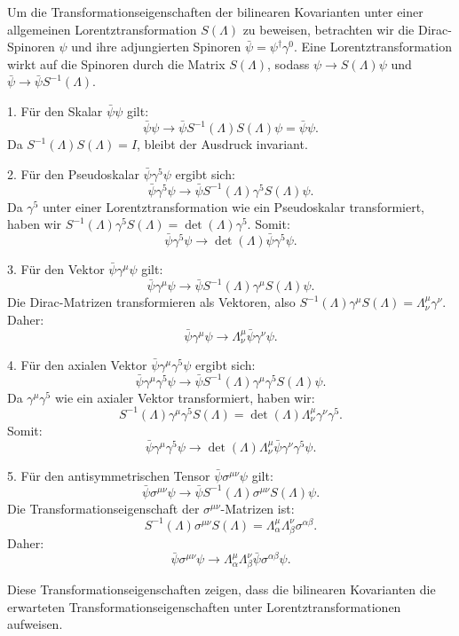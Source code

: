 Um die Transformationseigenschaften der bilinearen Kovarianten unter einer allgemeinen Lorentztransformation \( S(\Lambda) \) zu beweisen, betrachten wir die Dirac-Spinoren \(\psi\) und ihre adjungierten Spinoren \(\bar{\psi} = \psi^\dagger \gamma^0\). Eine Lorentztransformation wirkt auf die Spinoren durch die Matrix \( S(\Lambda) \), sodass \(\psi \rightarrow S(\Lambda) \psi\) und \(\bar{\psi} \rightarrow \bar{\psi} S^{-1}(\Lambda)\).

1. Für den Skalar \(\bar{\psi} \psi\) gilt:
\[
\bar{\psi} \psi \rightarrow \bar{\psi} S^{-1}(\Lambda) S(\Lambda) \psi = \bar{\psi} \psi.
\]
Da \(S^{-1}(\Lambda) S(\Lambda) = I\), bleibt der Ausdruck invariant.

2. Für den Pseudoskalar \(\bar{\psi} \gamma^5 \psi\) ergibt sich:
\[
\bar{\psi} \gamma^5 \psi \rightarrow \bar{\psi} S^{-1}(\Lambda) \gamma^5 S(\Lambda) \psi.
\]
Da \(\gamma^5\) unter einer Lorentztransformation wie ein Pseudoskalar transformiert, haben wir \(S^{-1}(\Lambda) \gamma^5 S(\Lambda) = \operatorname{det}(\Lambda) \gamma^5\). Somit:
\[
\bar{\psi} \gamma^5 \psi \rightarrow \operatorname{det}(\Lambda) \bar{\psi} \gamma^5 \psi.
\]

3. Für den Vektor \(\bar{\psi} \gamma^\mu \psi\) gilt:
\[
\bar{\psi} \gamma^\mu \psi \rightarrow \bar{\psi} S^{-1}(\Lambda) \gamma^\mu S(\Lambda) \psi.
\]
Die Dirac-Matrizen transformieren als Vektoren, also \(S^{-1}(\Lambda) \gamma^\mu S(\Lambda) = \Lambda_\nu^\mu \gamma^\nu\). Daher:
\[
\bar{\psi} \gamma^\mu \psi \rightarrow \Lambda_\nu^\mu \bar{\psi} \gamma^\nu \psi.
\]

4. Für den axialen Vektor \(\bar{\psi} \gamma^\mu \gamma^5 \psi\) ergibt sich:
\[
\bar{\psi} \gamma^\mu \gamma^5 \psi \rightarrow \bar{\psi} S^{-1}(\Lambda) \gamma^\mu \gamma^5 S(\Lambda) \psi.
\]
Da \(\gamma^\mu \gamma^5\) wie ein axialer Vektor transformiert, haben wir:
\[
S^{-1}(\Lambda) \gamma^\mu \gamma^5 S(\Lambda) = \operatorname{det}(\Lambda) \Lambda_\nu^\mu \gamma^\nu \gamma^5.
\]
Somit:
\[
\bar{\psi} \gamma^\mu \gamma^5 \psi \rightarrow \operatorname{det}(\Lambda) \Lambda_\nu^\mu \bar{\psi} \gamma^\nu \gamma^5 \psi.
\]

5. Für den antisymmetrischen Tensor \(\bar{\psi} \sigma^{\mu \nu} \psi\) gilt:
\[
\bar{\psi} \sigma^{\mu \nu} \psi \rightarrow \bar{\psi} S^{-1}(\Lambda) \sigma^{\mu \nu} S(\Lambda) \psi.
\]
Die Transformationseigenschaft der \(\sigma^{\mu \nu}\)-Matrizen ist:
\[
S^{-1}(\Lambda) \sigma^{\mu \nu} S(\Lambda) = \Lambda_\alpha^\mu \Lambda_\beta^\nu \sigma^{\alpha \beta}.
\]
Daher:
\[
\bar{\psi} \sigma^{\mu \nu} \psi \rightarrow \Lambda_\alpha^\mu \Lambda_\beta^\nu \bar{\psi} \sigma^{\alpha \beta} \psi.
\]

Diese Transformationseigenschaften zeigen, dass die bilinearen Kovarianten die erwarteten Transformationseigenschaften unter Lorentztransformationen aufweisen.